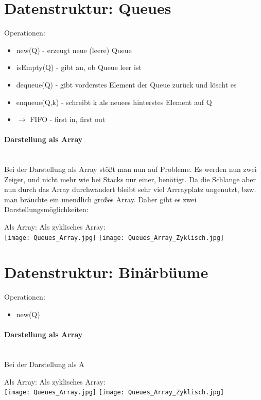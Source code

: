	

\section{Datenstruktur: Queues}

	Operationen:
	\begin{itemize}
		\item new(Q) - erzeugt neue (leere) Queue
		\item isEmpty(Q) - gibt an, ob Queue leer ist
		\item dequeue(Q) - gibt vorderstes Element der Queue zurück und löscht es
		\item enqueue(Q,k) - schreibt k als neuees hinterstes Element auf Q
		\item $\longrightarrow$ FIFO - first in, first out
	\end{itemize}

	\paragraph{Darstellung als Array} \mbox{} \\
	Bei der Darstellung als Array stö\ss t man nun auf Probleme. Es werden nun zwei Zeiger, 
	und nicht mehr wie bei Stacks nur einer, benötigt. Da die Schlange aber nun durch das 
	Array durchwandert bleibt sehr viel Arrrayplatz ungenutzt, bzw. man bräuchte ein unendlich
	gro\ss es Array. Daher gibt es zwei Darstellungsmöglichkeiten:
	\begin{center}
		Als Array: \hspace{5cm} Als zyklisches Array:\\
		\texttt{[image: Queues\_Array.jpg]}
		\texttt{[image: Queues\_Array\_Zyklisch.jpg]}
	\end{center}





\vspace{1.5cm}
\section{Datenstruktur: Binärbüume}

	Operationen:
	\begin{itemize}
		\item new(Q)
	\end{itemize}

	\paragraph{Darstellung als Array} \mbox{} \\
	Bei der Darstellung als A
	\begin{center}
		Als Array: \hspace{5cm} Als zyklisches Array:\\
		\texttt{[image: Queues\_Array.jpg]}
		\texttt{[image: Queues\_Array\_Zyklisch.jpg]}
	\end{center}





